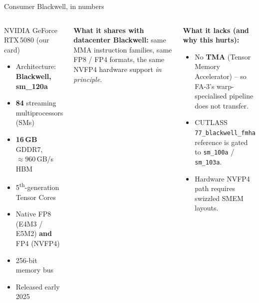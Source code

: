 \documentclass[10pt,aspectratio=169]{beamer}
\begin{document}
\begin{frame}{Consumer Blackwell, in numbers}
  \begin{columns}[T]
      \begin{block}{NVIDIA GeForce RTX\,5080 (our card)}
        \begin{itemize}
          \item Architecture: \textbf{Blackwell, sm\_120a}
          \item \textbf{84} streaming multiprocessors (SMs)
          \item \textbf{16\,GB} GDDR7, $\approx 960$\,GB/s HBM
          \item 5\textsuperscript{th}-generation Tensor Cores
          \item Native FP8 (E4M3 / E5M2) \textbf{and} FP4 (NVFP4)
          \item 256-bit memory bus
          \item Released early 2025
        \end{itemize}
      \end{block}
      \begin{aha}
        \textbf{What it shares with datacenter Blackwell:} same MMA
        instruction families, same FP8 / FP4 formats, the same NVFP4
        hardware support \emph{in principle}.
      \end{aha}
      \begin{whatbroke}
        \textbf{What it lacks (and why this hurts):}
        \begin{itemize}
          \item No \textbf{TMA} (Tensor Memory Accelerator) -- so
                FA-3's warp-specialised pipeline does not transfer.
          \item CUTLASS \texttt{77\_blackwell\_fmha} reference is
                gated to \texttt{sm\_100a} / \texttt{sm\_103a}.
          \item Hardware NVFP4 path requires swizzled SMEM layouts.
        \end{itemize}
      \end{whatbroke}
  \end{columns}
\end{frame}
\end{document}
